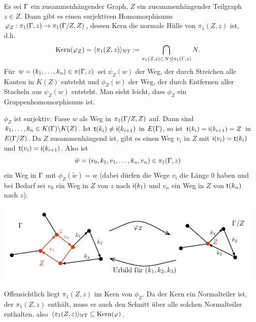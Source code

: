 \documentclass[a4paper, 12pt, twoside]{article}
\begin{document}
\BEM Es sei $\Gamma$ ein zusammenhängender Graph, $Z$ ein zusammenhängender 
Teilgraph $z\in Z$.
Dann gibt es einen surjektiven Homomorphismus
$\varphi_Z:\pi_1(\Gamma,z)\rightarrow\pi_1(\Gamma/Z,Z)$, dessen Kern die
normale Hülle von $\pi_1(Z,z)$ ist, d.h.
\[
\mathrm{Kern}(\varphi_Z)=\langle\pi_1(Z,z)\rangle_{\mathrm{NT}}:=
\bigcap_{\pi_1(Z,z)\subset N \unlhd \pi_1(\Gamma,z)} N.
\]
\bew Für $w=(k_1,\ldots,k_n)\in\pi(\Gamma,z)$ sei
$\psi_Z(w)$ der Weg, der durch Streichen alle Kanten in $K(Z)$
entsteht und $\phi_Z(w)$ der Weg, der durch Entfernen aller Stacheln
aus $\psi_Z(w)$ entsteht. Man sieht leicht, dass $\phi_Z$ ein
Gruppenhomomorphismus ist.

$\phi_Z$ ist surjektiv: Fasse $w$ als Weg in $\pi_1(\Gamma/Z,Z)$ auf.
Dann sind $k_1,\ldots,k_n\in K(\Gamma)\backslash K(Z)$.
Ist $\mathsf{t}(k_i)\neq \mathsf{i}(k_{i+1})$ in $E(\Gamma)$, so ist
$\mathsf{t}(k_i)=\mathsf{i}(k_{i+1})=Z$ in $E(\Gamma/Z)$.
Da $Z$ zusammenhängend ist, gibt es einen Weg $v_i$ in $Z$ mit
$\mathsf{i}(v_i)=\mathsf{t}(k_i)$ und $\mathsf{t}(v_i)=\mathsf{i}(k_{i+1})$.
Also ist
\[
\tilde{w}=
(v_0,k_1,v_1,\ldots,k_n,v_n) \in \pi_1(\Gamma,z)
\]
ein Weg in $\Gamma$ mit $\phi_Z(\tilde{w})=w$
(dabei dürfen die Wege $v_i$ die Länge $0$ haben und bei Bedarf
sei $v_0$ ein Weg in $Z$ von $z$ nach $\mathsf{i}(k_1)$ und $v_n$ ein
Weg in $Z$ von $\mathsf{t}(k_n)$ nach $z$).
\begin{center}
	\includegraphics{grugraImages/phiZ}
\end{center}
Offensichtlich liegt $\pi_1(Z,z)$ im Kern von $\phi_Z$. Da der Kern
ein Normalteiler ist, der $\pi_1(Z,z)$ enthält, muss er auch
den Schnitt über alle solchen Normalteiler enthalten,
also $\langle \pi_1(Z,z)\rangle_{\mathrm{NT}}\subseteq \mathrm{Kern}(\varphi)$.
\end{document}
